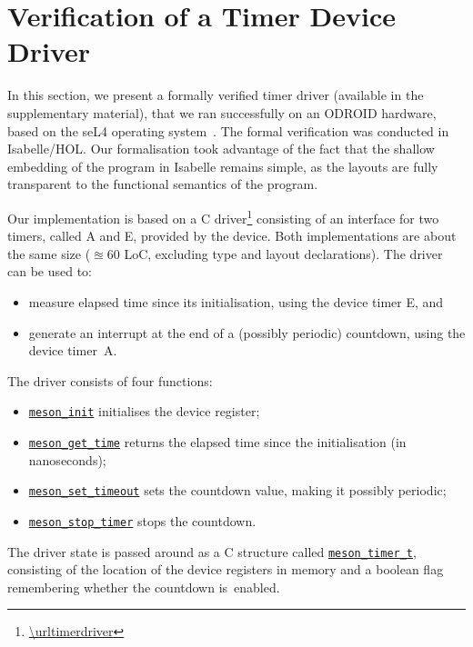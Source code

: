 \section{Verification of a Timer Device Driver}
\label{sec:timerdriver}

In this section, we present a formally verified \cogent timer driver (available
in the supplementary material), that we ran
successfully on an ODROID hardware, based on the seL4 operating system~\citep{seL4:2022}. The formal verification was conducted in Isabelle/HOL.
Our formalisation took advantage of the fact that the
shallow embedding of the \cogent program in Isabelle remains simple, as the layouts are fully transparent to the functional
semantics of the \cogent program.


Our \cogent implementation is based on a C driver\footnote{\url{\urltimerdriver}}
consisting of an interface for two timers, called A and E, provided by the device.
Both implementations are about the same size ($\approxeq$60 LoC, excluding type
and layout declarations). 
%
The driver can be used to:
\begin{itemize}
\item 
  measure elapsed time since its initialisation, using the device timer E, and
  \item
    generate an interrupt at the end of a (possibly periodic) countdown,
    using the device timer~A.
\end{itemize}
The driver consists of four functions:
\begin{itemize}
\item
  \href{\urltimerdriver#L13}{\lstinline{meson_init}}
  initialises the device register;
  \item
    \href{\urltimerdriver#L29}{\lstinline{meson_get_time}} returns the elapsed time
    since the initialisation (in nanoseconds);
  \item 
    \href{\urltimerdriver#L29}{\lstinline{meson_set_timeout}}
    sets the countdown value, making it possibly periodic;
  \item 
    \href{\urltimerdriver#L59}{\lstinline{meson_stop_timer}} stops the countdown.
\end{itemize}
The driver state is passed around as a C structure called
\href{\urltimerdriverh#L82}{\lstinline{meson_timer_t}}, consisting of
the location of the device registers in memory and a boolean flag
remembering whether the countdown is~enabled.



